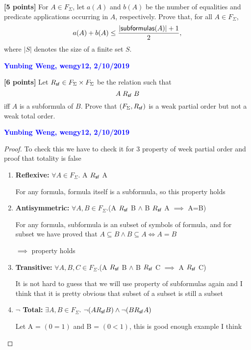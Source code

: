 \documentclass[11pt,fleqn]{article}
\newcommand{\mname}[1]{\mbox{\sf #1}}
\begin{document}
  

  \item \textbf{[5 points]} For $A \in F_{\Sigma}$, let $a(A)$ and
    $b(A)$ be the number of equalities and predicate applications
    occurring in $A$, respectively.  Prove that, for all $A \in
    F_{\Sigma}$, \[a(A) + b(A) \le \frac{|\mname{subformulas}(A)| +
      1}{2},\] where $|S|$ denotes the size of a finite set $S$.

  \textcolor{blue}{\textbf{Yunbing Weng, wengy12, 2/10/2019}}


      

  \item \textbf{[6 points]} Let $R_{\sf sf} \in F_{\Sigma} \times
    F_{\Sigma}$ be the relation such that \[A \mathrel{R_{\sf sf}} B\]
    iff $A$ is a subformula of $B$.  Prove that $(F_{\Sigma},R_{\sf
      sf})$ is a weak partial order but not a weak total order.

  \textcolor{blue}{\textbf{Yunbing Weng, wengy12, 2/10/2019}}

  \begin{proof}
  
  To check this we have to check it for 3 property of week partial order and proof that totality is false
  
  \begin{enumerate}
  
  \item  \textbf{Reflexive: } $\forall A \in F_{\Sigma}.$ A $R_{\sf sf}$ A

  For any formula, formula itself is a subformula, so this property holds

  \item \textbf{Antisymmetric: } $\forall A, B \in F_{\Sigma}.$(A $R_{\sf sf}$ B $\land$ B $R_{\sf sf}$ A $\implies$ A=B)

For any formula, subformula is an subset of symbols of formula, and for subset we have proved that $A \subseteq B \land B \subseteq A \iff A=B$

$\implies$ property holds

  \item \textbf{Transitive: } $\forall A, B, C \in F_{\Sigma}.$(A $R_{\sf sf}$ B $\land$ B $R_{\sf sf}$ C $\implies$ A $R_{\sf sf}$ C)

It is not hard to guess that we will use property of subformulas again and I think that it is pretty obvious that subset of a subset is still a subset

  \item \textbf{$\lnot$ Total: } $\exists A, B \in F_{\Sigma}$. $\lnot(A R_{\sf sf} B) \land \lnot(B R_{\sf sf} A)$

Let A = $(0 = 1)$ and B = $(0 < 1)$, this is good enough example I think

  \end{enumerate}
  
  
  
  \end{proof}
\end{document}
